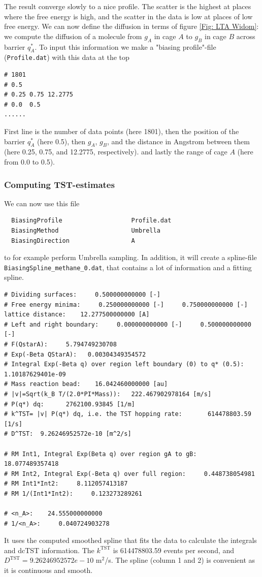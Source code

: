 The result converge slowly to a nice profile. The scatter is the highest at places where the free energy is high, and
the scatter in the data is low at places of low free energy. We can now define the diffusion in terms of
figure \ref{Fig: LTA Widom}: we compute the diffusion of a molecule from $g_A$ in cage $A$ to $g_B$ in cage $B$
across barrier $q_A^*$.
To input this information we make a "biasing profile"-file (\verb+Profile.dat+) with this data at the top
\begin{small}
\begin{verbatim}
# 1801
# 0.5
# 0.25 0.75 12.2775
# 0.0  0.5
......
\end{verbatim}
\end{small}
First line is the number of data points (here 1801), then the position of the barrier $q_A^*$ (here 0.5),
then $g_A$, $g_B$, and the distance in Angstrom between them (here 0.25, 0.75, and 12.2775, respectively).
and lastly the range of cage $A$ (here from 0.0 to 0.5).

\subsubsection{Computing TST-estimates}

We can now use this file
\begin{verbatim}
  BiasingProfile                   Profile.dat
  BiasingMethod                    Umbrella
  BiasingDirection                 A
\end{verbatim}
to for example perform Umbrella sampling. In addition, it will create a spline-file
\verb+BiasingSpline_methane_0.dat+, that contains a lot of information and a fitting spline.
\begin{small}
\begin{verbatim}
# Dividing surfaces:     0.500000000000 [-]
# Free energy minima:     0.250000000000 [-]     0.750000000000 [-]  lattice distance:    12.277500000000 [A]
# Left and right boundary:     0.000000000000 [-]     0.500000000000 [-]
# F(QstarA):     5.794749230708
# Exp(-Beta QStarA):   0.00304349354572
# Integral Exp(-Beta q) over region left boundary (0) to q* (0.5):  1.10187629401e-09
# Mass reaction bead:    16.042460000000 [au]
# |v|=Sqrt(k_B T/(2.0*PI*Mass)):   222.467902978164 [m/s]
# P(q*) dq:      2762100.93845 [1/m]
# k^TST= |v| P(q*) dq, i.e. the TST hopping rate:       614478803.59 [1/s]
# D^TST:  9.26246952572e-10 [m^2/s]

# RM Int1, Integral Exp(Beta q) over region gA to gB:    18.077489357418
# RM Int2, Integral Exp(-Beta q) over full region:     0.448738054981
# RM Int1*Int2:     8.112057413187
# RM 1/(Int1*Int2):     0.123273289261

# <n_A>:    24.555000000000
# 1/<n_A>:     0.040724903278
\end{verbatim}
\end{small}
It uses the computed smoothed spline that fits the data to calculate the integrals and dcTST information.
The $k^\text{TST}$ is 614478803.59 events per second, and $D^\text{TST}=9.26246952572e-10$ m$^2$/s.
The spline (column 1 and 2) is convenient as it is continuous and smooth.

